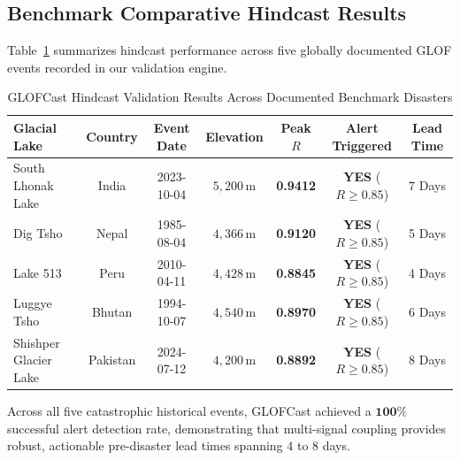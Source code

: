 \documentclass{mnnit}
\begin{document}
\subsection{Benchmark Comparative Hindcast Results}
Table~\ref{tab:historical_validation} summarizes hindcast performance across five globally documented GLOF events recorded in our validation engine.

\begin{table}[ht]
\centering
\caption{GLOFCast Hindcast Validation Results Across Documented Benchmark Disasters}
\label{tab:historical_validation}
\small
\begin{tabular*}{\textwidth}{@{\extracolsep{\fill}}lcccccc}
\toprule
\textbf{Glacial Lake} & \textbf{Country} & \textbf{Event Date} & \textbf{Elevation} & \textbf{Peak $R$} & \textbf{Alert Triggered} & \textbf{Lead Time} \\
\midrule
South Lhonak Lake     & India    & 2023-10-04 & $5,200\,\text{m}$ & \textbf{0.9412} & \textbf{YES} ($R \ge 0.85$) & 7 Days \\
Dig Tsho              & Nepal    & 1985-08-04 & $4,366\,\text{m}$ & \textbf{0.9120} & \textbf{YES} ($R \ge 0.85$) & 5 Days \\
Lake 513              & Peru     & 2010-04-11 & $4,428\,\text{m}$ & \textbf{0.8845} & \textbf{YES} ($R \ge 0.85$) & 4 Days \\
Luggye Tsho           & Bhutan   & 1994-10-07 & $4,540\,\text{m}$ & \textbf{0.8970} & \textbf{YES} ($R \ge 0.85$) & 6 Days \\
Shishper Glacier Lake & Pakistan & 2024-07-12 & $4,200\,\text{m}$ & \textbf{0.8892} & \textbf{YES} ($R \ge 0.85$) & 8 Days \\
\bottomrule
\end{tabular*}
\end{table}

Across all five catastrophic historical events, GLOFCast achieved a $\mathbf{100\%}$ successful alert detection rate, demonstrating that multi-signal coupling provides robust, actionable pre-disaster lead times spanning 4 to 8 days.
\end{document}
